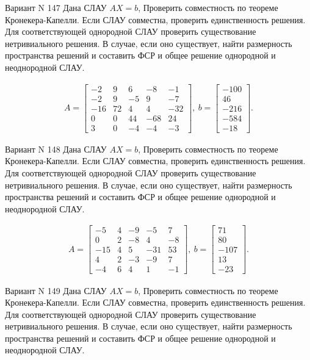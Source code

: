 \documentclass[11pt]{report}
\begin{document}
Вариант N 147
Дана СЛАУ $AX = b$,
Проверить совместность по теореме Кронекера-Капелли. Если СЛАУ совместна, проверить единственность решения.
Для соответствующей однородной СЛАУ проверить существование нетривиального решения. В случае, если оно существует,
найти размерность пространства решений и составить ФСР и общее решение однородной  и неоднородной СЛАУ.


\begin{align*}
 A = \left[\begin{matrix}-2 & 9 & 6 & -8 & -1\\-2 & 9 & -5 & 9 & -7\\-16 & 72 & 4 & 4 & -32\\0 & 0 & 44 & -68 & 24\\3 & 0 & -4 & -4 & -3\end{matrix}\right],
\ b = \left[\begin{matrix}-100\\46\\-216\\-584\\-18\end{matrix}\right]. 
 \end{align*}

Вариант N 148
Дана СЛАУ $AX = b$,
Проверить совместность по теореме Кронекера-Капелли. Если СЛАУ совместна, проверить единственность решения.
Для соответствующей однородной СЛАУ проверить существование нетривиального решения. В случае, если оно существует,
найти размерность пространства решений и составить ФСР и общее решение однородной  и неоднородной СЛАУ.


\begin{align*}
 A = \left[\begin{matrix}-5 & 4 & -9 & -5 & 7\\0 & 2 & -8 & 4 & -8\\-15 & 4 & 5 & -31 & 53\\4 & 2 & -3 & -9 & 7\\-4 & 6 & 4 & 1 & -1\end{matrix}\right],
\ b = \left[\begin{matrix}71\\80\\-107\\13\\-23\end{matrix}\right]. 
 \end{align*}

Вариант N 149
Дана СЛАУ $AX = b$,
Проверить совместность по теореме Кронекера-Капелли. Если СЛАУ совместна, проверить единственность решения.
Для соответствующей однородной СЛАУ проверить существование нетривиального решения. В случае, если оно существует,
найти размерность пространства решений и составить ФСР и общее решение однородной  и неоднородной СЛАУ.
\end{document}
